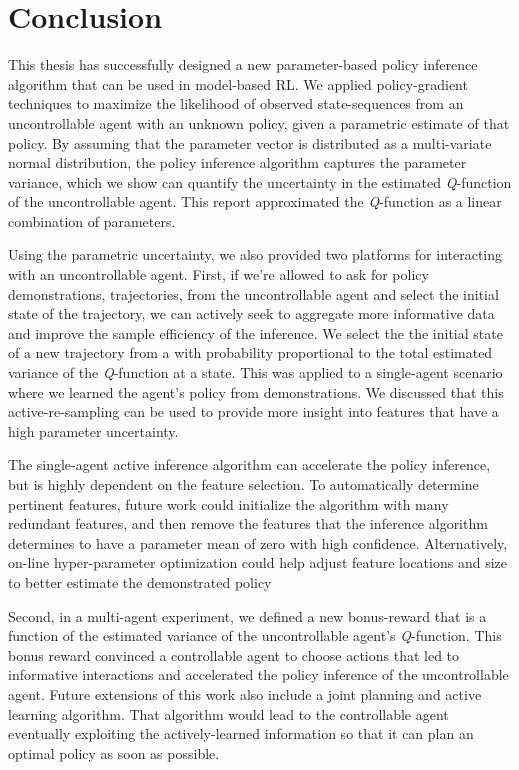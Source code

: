 \chapter{Conclusion}\label{chapt:conclusion}

This thesis has successfully designed a new parameter-based policy inference algorithm that can be used in model-based
\ac{RL}. We applied policy-gradient techniques to maximize the likelihood of observed state-sequences from an
uncontrollable agent with an unknown policy, given a parametric estimate of that policy. By assuming that the parameter
vector is distributed as a multi-variate normal distribution, the policy inference algorithm captures the parameter
variance, which we show can quantify the uncertainty in the estimated \emph{Q}-function of the uncontrollable agent.
This report approximated the \emph{Q}-function as a linear combination of parameters.


Using the parametric uncertainty, we also provided two platforms for interacting with an uncontrollable agent. First, if
we're allowed to ask for policy demonstrations, trajectories, from the uncontrollable agent and select the initial state
of the trajectory, we can actively seek to aggregate more informative data and improve the sample efficiency of the
inference. We select the the initial state of a new trajectory from a with probability proportional to the total
estimated variance of the \emph{Q}-function at a state. This was applied to a single-agent scenario where we learned the
agent's policy from demonstrations. We discussed that this active-re-sampling can be used to provide more insight into
features that have a high parameter uncertainty.

The single-agent active inference algorithm can accelerate the policy inference, but is highly dependent on the feature
selection. To automatically determine pertinent features, future work could initialize the algorithm with many redundant
features, and then remove the features that the inference algorithm determines to have a parameter mean of zero with
high confidence. Alternatively, on-line hyper-parameter optimization could help adjust feature locations and size to
better estimate the demonstrated policy

Second, in a multi-agent experiment, we defined a new bonus-reward that is a function of the estimated variance of the
uncontrollable agent's \emph{Q}-function. This bonus reward convinced a controllable agent to choose actions that led to
informative interactions and accelerated the policy inference of the uncontrollable agent. Future extensions of this
work also include a joint planning and active learning algorithm. That algorithm would lead to the controllable agent
eventually exploiting the actively-learned information so that it can plan an optimal policy as soon as possible.

